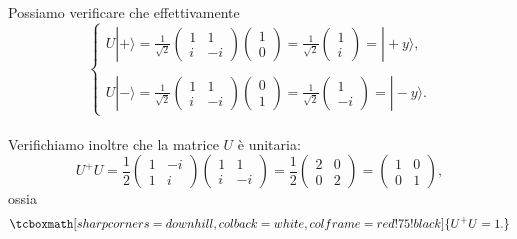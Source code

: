 \documentclass[a4paper,12pt,oneside]{book}
\begin{document}
Possiamo verificare che effettivamente
	\begin{equation}
		\begin{cases}
		U | + \rangle = \frac{1}{\sqrt{2}}
		\begin{pmatrix}
		1 & 1 \\
		i & -i
		\end{pmatrix}
		\begin{pmatrix}
		1\\
		0
		\end{pmatrix}=
		\frac{1}{\sqrt{2}}
		\begin{pmatrix}
		1\\
		i
		\end{pmatrix}=
		| +y \rangle , \\
		\\
		U | - \rangle= \frac{1}{\sqrt{2}}
		\begin{pmatrix}
		1 & 1 \\
		i & -i
		\end{pmatrix}
		\begin{pmatrix}
		0\\
		1
		\end{pmatrix}=
		\frac{1}{\sqrt{2}}
		\begin{pmatrix}
		1\\
		-i
		\end{pmatrix}=
		| -y \rangle . 
		\end{cases}
	\end{equation}\\
	
Verifichiamo inoltre che la matrice $U$ è unitaria:
	\begin{equation}
		U^+U = \frac{1}{2}
		\begin{pmatrix}
		1 & -i\\
		1 & i
		\end{pmatrix}
		\begin{pmatrix}
		1 & 1\\
		i & -i
		\end{pmatrix}=
		\frac{1}{2}
		\begin{pmatrix}
		2 & 0\\
		0 & 2
		\end{pmatrix}=
		\begin{pmatrix}
		1 & 0\\
		0 &1
		\end{pmatrix} , 
	\end{equation}
ossia
	\begin{equation}
		\tcboxmath[sharp corners=downhill ,colback=white,colframe=red!75!black]{
			U^+U=1 .
			} 
	\end{equation}\\
\end{document}
